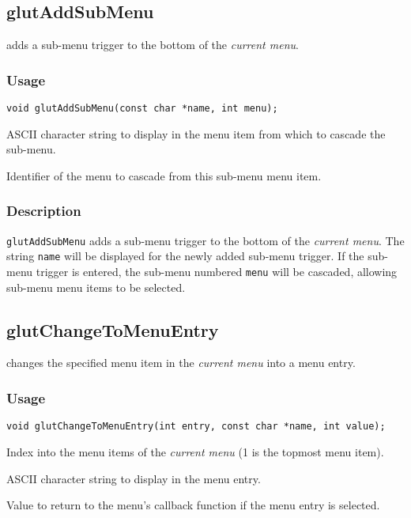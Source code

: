 \subsection{glutAddSubMenu}

 adds a sub-menu trigger to the bottom of the {\em current menu}.

\subsubsection*{Usage}
\begin{verbatim}
void glutAddSubMenu(const char *name, int menu);
\end{verbatim}
\begin{description}
\itemsep 0in
\item[{\tt name}]
ASCII character string to display in the menu item from which to cascade the sub-menu.
\item[{\tt menu}]
Identifier of the menu to cascade from this sub-menu menu item.
\end{description}

\subsubsection*{Description}

{\tt glutAddSubMenu} adds a sub-menu trigger to the bottom of the {\em current menu}.
The string {\tt name} will be displayed for the newly added sub-menu trigger.
If the sub-menu trigger is entered, the sub-menu numbered {\tt menu} will
be cascaded, allowing sub-menu menu items to be selected.

\subsection{glutChangeToMenuEntry}

 changes the specified menu item in the {\em current
menu} into a menu entry.

\subsubsection*{Usage}
\begin{verbatim}
void glutChangeToMenuEntry(int entry, const char *name, int value);
\end{verbatim}
\begin{description}
\itemsep 0in
\item[{\tt entry}]
Index into the menu items of the {\em current menu} (1 is the topmost
menu item).
\item[{\tt name}]
ASCII character string to display in the menu entry.
\item[{\tt value}]
Value to return to the menu's callback function if the menu entry is selected.
\end{description}

